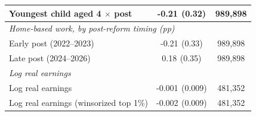 {\begin{longtable}{lcc}
Youngest child aged 4 $\times$ post & -0.21$^{}$ (0.32) & 989,898 \\
\midrule
\multicolumn{3}{l}{\textit{Home-based work, by post-reform timing (pp)}} \\
Early post (2022--2023) & -0.21$^{}$ (0.33) & 989,898 \\
Late post (2024--2026) & 0.18$^{}$ (0.35) & 989,898 \\
\midrule
\multicolumn{3}{l}{\textit{Log real earnings}} \\
Log real earnings & -0.001$^{}$ (0.009) & 481,352 \\
Log real earnings (winsorized top 1\%) & -0.002$^{}$ (0.009) & 481,352 \\
\end{longtable}
}
